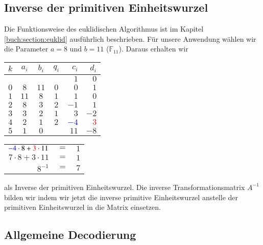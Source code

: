 \subsection{Inverse der primitiven Einheitswurzel
\label{reedsolomon:subsection:invEinh}}

Die Funktionsweise des euklidischen Algorithmus ist im Kapitel \ref{buch:section:euklid} ausführlich beschrieben.
Für unsere Anwendung wählen wir die Parameter $a = 8$ und $b = 11$ ($\mathbb{F}_{11}$).
Daraus erhalten wir 

\begin{center}

\begin{tabular}{| c | c c | c | r r |}
	\hline
	$k$ & $a_i$ & $b_i$ & $q_i$ & $c_i$ & $d_i$\\
	\hline 
	& & & & $1$& $0$\\
	$0$& $8$& $11$& $0$& $0$& $1$\\
	$1$& $11$& $8$& $1$& $1$& $0$\\
	$2$& $8$& $3$& $2$& $-1$& $1$\\
	$3$& $3$& $2$& $1$& $3$& $-2$\\
	$4$& $2$& $1$& $2$& \textcolor{blue}{$-4$}& \textcolor{red}{$3$}\\
	$5$& $1$& $0$& & $11$& $-8$\\
	\hline
\end{tabular}

\end{center}
\begin{center}

\begin{tabular}{rcl}
	$\textcolor{blue}{-4} \cdot 8 + \textcolor{red}{3} \cdot 11$ &$=$& $1$\\
	$7 \cdot 8 + 3 \cdot 11$ &$=$& $1$\\
	$8^{-1}$ &$=$& $7$
	
\end{tabular}

\end{center}
als Inverse der primitiven Einheitswurzel. Die inverse Transformationsmatrix $A^{-1}$ bilden wir indem wir jetzt die inverse primitive Einheitswurzel anstelle der primitiven Einheitswurzel in die Matrix einsetzen. 

\subsection{Allgemeine Decodierung
	\label{reedsolomon:subsection:algdec}}

